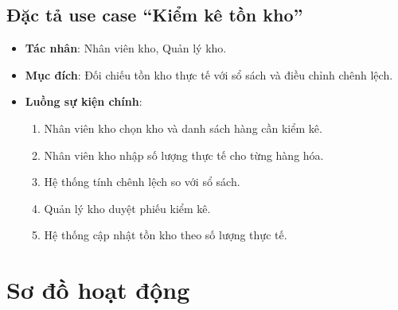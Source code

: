 \subsection{Đặc tả use case ``Kiểm kê tồn kho''}

\begin{itemize}[leftmargin=1.5cm]
    \item \textbf{Tác nhân}: Nhân viên kho, Quản lý kho.
    \item \textbf{Mục đích}: Đối chiếu tồn kho thực tế với sổ sách và điều chỉnh chênh lệch.
    \item \textbf{Luồng sự kiện chính}:
    \begin{enumerate}
        \item Nhân viên kho chọn kho và danh sách hàng cần kiểm kê.
        \item Nhân viên kho nhập số lượng thực tế cho từng hàng hóa.
        \item Hệ thống tính chênh lệch so với sổ sách.
        \item Quản lý kho duyệt phiếu kiểm kê.
        \item Hệ thống cập nhật tồn kho theo số lượng thực tế.
    \end{enumerate}
\end{itemize}

\section{Sơ đồ hoạt động}


